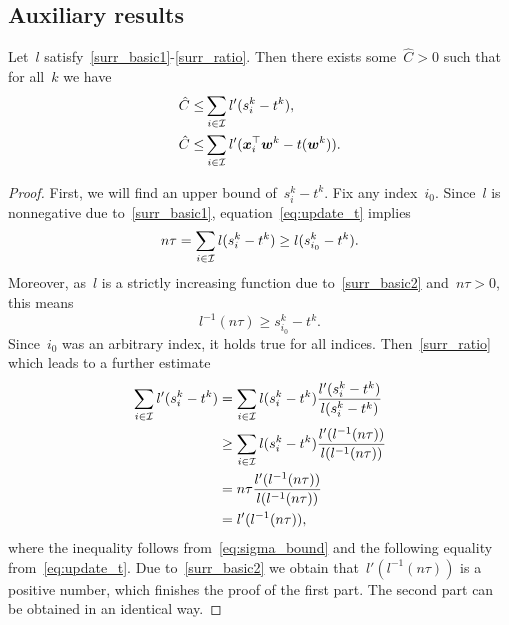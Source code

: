 \subsection{Auxiliary results}\label{app:sgd3}

\begin{lemma}\label{lemma:bound_zero}
  Let~$l$ satisfy~\ref{surr_basic1}-\ref{surr_ratio}. Then there exists some~$\hat{C} > 0$ such that for all~$k$ we have
  \begin{equation*}
    \begin{aligned}
      \hat{C} \leq & \sum_{i \in \mathcal{I}} l'(s_i^k - t^k), \\
      \hat{C} \leq & \sum_{i \in \mathcal{I}} l'(\bm{x}_i^\top \bm{w}^k - t(\bm{w}^k)).
    \end{aligned}
  \end{equation*}
\end{lemma}
\begin{proof}
  First, we will find an upper bound of~$s_i^k-t^k$. Fix any index~$i_0$. Since~$l$ is nonnegative due to~\ref{surr_basic1}, equation~\eqref{eq:update_t} implies
  \begin{equation*}
    n\tau = \sum_{i \in \mathcal{I}} l(s_i^k - t^k) \geq l(s_{i_0}^k - t^k).
  \end{equation*}
  Moreover, as~$l$ is a strictly increasing function due to~\ref{surr_basic2} and~$n\tau>0$, this means 
  \begin{equation}\label{eq:sigma_bound}
    l^{-1}(n\tau) \geq s_{i_0}^k-t^k.
  \end{equation}
  Since~$i_0$ was an arbitrary index, it holds true for all indices. Then~\ref{surr_ratio} which leads to a further estimate
  \begin{equation*}
    \begin{aligned}
    \sum_{i \in \mathcal{I}} l'(s_i^k - t^k)
      & = \sum_{i\in \mathcal{I}} l(s_i^k-t^k) \frac{l'(s_i^k-t^k)}{l(s_i^k-t^k)} \\
      & \geq \sum_{i \in \mathcal{I}} l(s_i^k - t^k) \frac{l'(l^{-1}(n\tau))}{l(l^{-1}(n\tau))} \\
      & = n\tau \frac{l'(l^{-1}(n\tau))}{l(l^{-1}(n\tau))} \\
      & = l'(l^{-1}(n\tau)),
    \end{aligned}
  \end{equation*}
  where the inequality follows from~\eqref{eq:sigma_bound} and the following equality from~\eqref{eq:update_t}. Due to~\ref{surr_basic2} we obtain that~$l'(l^{-1}(n\tau))$ is a positive number, which finishes the proof of the first part. The second part can be obtained in an identical way.
\end{proof}



